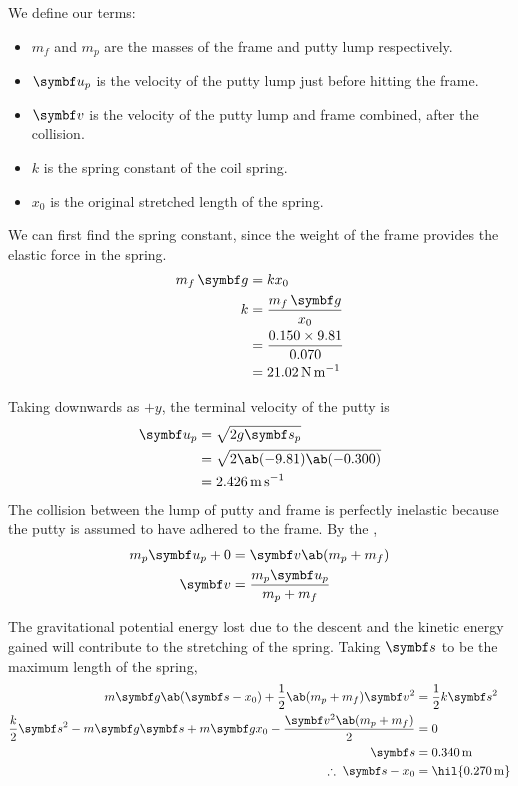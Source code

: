 We define our terms:
\begin{itemize}
  \item \(m_f\) and \(m_p\) are the masses of the frame and putty
    lump respectively.
  \item \(\mv{u}_p\) is the velocity of the putty lump just before
    hitting the frame.
  \item \(\mv{v}\) is the velocity of the putty lump and frame
    combined, after the collision.
  \item \(k\) is the spring constant of the coil spring.
  \item \(x_0\) is the original stretched length of the spring.
\end{itemize}

We can first find the spring constant, since the weight of the frame
provides the elastic force in the spring.
\begin{align*}
  m_f\,\mv{g} &= kx_0 \\
  k &= \f{m_f\,\mv{g}}{x_0} \\
  &= \f{0.150\times 9.81}{0.070} \\
  &= \qty{21.02}{\newton\per\metre}
\end{align*}

Taking downwards as \(+y\), the terminal velocity of the putty is
\begin{align*}
  \mv{u}_p &= \sqrt{2g\mv{s}_p} \\
  &= \sqrt{2\ab(-9.81)\ab(-0.300)} \\
  &= \qty{2.426}{\metre\per\second}
\end{align*}
The collision between the lump of putty and frame is perfectly
inelastic because the putty is assumed to
have adhered to the frame. By the ,
\begin{align*}
  m_p\mv{u}_p + 0 &= \mv{v}\ab(m_p + m_f) \\
  \mv{v} &= \f{m_p\mv{u}_p}{m_p + m_f}
\end{align*}

The gravitational potential energy lost due to the descent and the
kinetic energy
gained will contribute to the stretching of the spring. Taking \(\mv{s}\) to be
the maximum length of the spring,
\begin{align*}
  m\mv{g}\ab(\mv{s}-x_0) + \f{1}{2}\ab(m_p + m_f)\mv{v}^2 &=
  \f{1}{2}k\mv{s}^2 \\
  \f{k}{2}\mv{s}^2 - m\mv{g}\mv{s} + m\mv{g}x_0 -
  \f{\mv{v}^2\ab(m_p+m_f)}{2} &= 0 \\
  \mv{s} &= \qty{0.340}{\metre} \\
  \therefore\;\mv{s} - x_0 &= \hil{\qty{0.270}{\metre}}
\end{align*}

